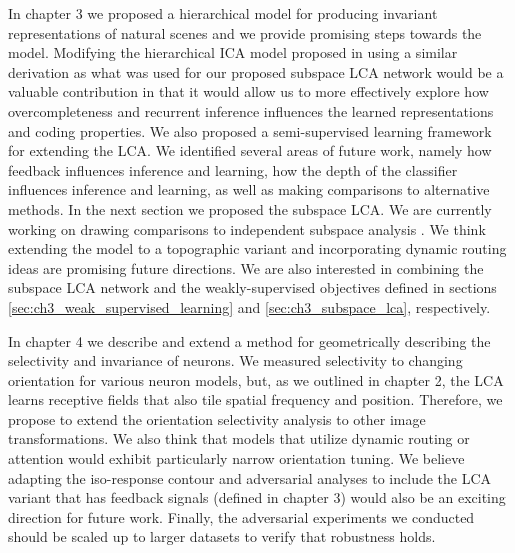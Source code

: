 In chapter 3 we proposed a hierarchical model for producing invariant representations of natural scenes and we provide promising steps towards the model. %
Modifying the hierarchical ICA model proposed in \parencite{karklin2003learning} using a similar derivation as what was used for our proposed subspace LCA network would be a valuable contribution in that it would allow us to more effectively explore how overcompleteness and recurrent inference influences the learned representations and coding properties.
We also proposed a semi-supervised learning framework for extending the LCA.
We identified several areas of future work, namely how feedback influences inference and learning, how the depth of the classifier influences inference and learning, as well as making comparisons to alternative methods.
In the next section we proposed the subspace LCA.
We are currently working on drawing comparisons to independent subspace analysis \parencite{hyvarinen2000emergence}.
We think extending the model to a topographic variant and incorporating dynamic routing ideas \parencite{olshausen1993neurobiological} are promising future directions.
We are also interested in combining the subspace LCA network and the weakly-supervised objectives defined in sections \ref{sec:ch3_weak_supervised_learning} and \ref{sec:ch3_subspace_lca}, respectively.

In chapter 4 we describe and extend a method for geometrically describing the selectivity and invariance of neurons. %
We measured selectivity to changing orientation for various neuron models, but, as we outlined in chapter 2, the LCA learns receptive fields that also tile spatial frequency and position. %
Therefore, we propose to extend the orientation selectivity analysis to other image transformations.
We also think that models that utilize dynamic routing or attention would exhibit particularly narrow orientation tuning.
We believe adapting the iso-response contour and adversarial analyses to include the LCA variant that has feedback signals (defined in chapter 3) would also be an exciting direction for future work. %
Finally, the adversarial experiments we conducted should be scaled up to larger datasets to verify that robustness holds.